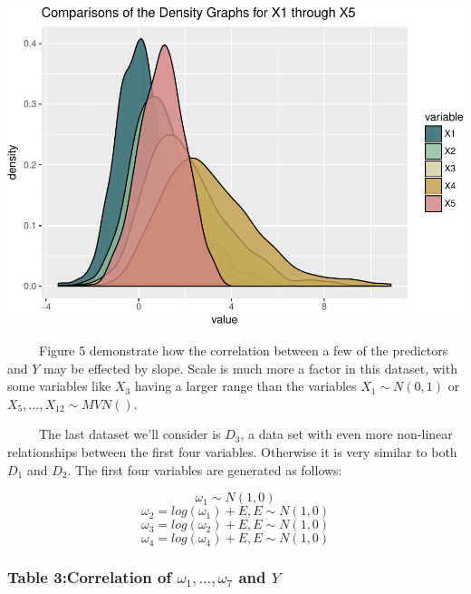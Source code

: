 \documentclass[12pt,twoside]{reedthesis}
\begin{document}
  \includegraphics{Thesis_files/figure-latex/fig5-1.pdf}
  
  ~~~~~Figure 5 demonstrate how the correlation between a few of the
  predictors and \(Y\) may be effected by slope. Scale is much more a
  factor in this dataset, with some variables like \(X_3\) having a larger
  range than the variables \(X_1 \sim N(0,1)\) or
  \(X_5,...,X_{12} \sim MVN()\).
  
  ~~~~~The last dataset we'll consider is \(D_3\), a data set with even
  more non-linear relationships between the first four variables.
  Otherwise it is very similar to both \(D_1\) and \(D_2\). The first four
  variables are generated as follows:
  
  \[\omega_1 \sim N(1,0)\] \[\omega_2 = log(\omega_1) + E, E \sim N(1,0)\]
  \[\omega_3 = log(\omega_2) + E, E \sim N(1,0)\]
  \[\omega_4 = log(\omega_4) + E, E \sim N(1,0)\]
  
  \subsubsection{\texorpdfstring{Table 3:Correlation of
  \(\omega_1,..., \omega_7\) and
  \(Y\)}{Table 3:Correlation of \textbackslash{}omega\_1,..., \textbackslash{}omega\_7 and Y}}\label{table-3correlation-of-omega_1...-omega_7-and-y}
  
\end{document}
